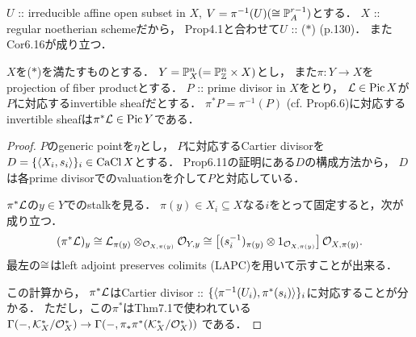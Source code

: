 \documentclass[a4paper]{jsarticle}
\newcommand{\CaCl}{\operatorname{CaCl}}
\newcommand{\Pic}{\operatorname{Pic}}
\begin{document}
    $U$ :: irreducible affine open subset in $X$, 
    $V=\pi^{-1}(U) (\cong \mathbb{P}_A^{r-1})$とする．
    $X$ :: regular noetherian schemeだから，
    Prop4.1と合わせて$U$ :: ($*$) (p.130)．
    またCor6.16が成り立つ．
    \begin{Claim}
        $X$を($*$)を満たすものとする．
        $Y=\mathbb{P}^n_X(=\mathbb{P}^n_{\mathbb{Z}} \times X)$とし，
        また$\pi: Y \to X$をprojection of fiber productとする．
        $P$ :: prime divisor in $X$をとり，
        $\shL \in \Pic X$が$P$に対応するinvertible sheafだとする．
        $\pi^* P=\pi^{-1}(P)$ (cf. Prop6.6)に対応するinvertible sheafは$\pi^* \shL \in \Pic Y$である．
    \end{Claim}
    \begin{proof}
        $P$のgeneric pointを$\eta$とし，
        $P$に対応するCartier divisorを
        $D=\{\sect{X_i}{s_i}\}_i \in \CaCl X$とする．
        Prop6.11の証明にある$D$の構成方法から，
        $D$は各prime divisorでのvaluationを介して$P$と対応している．

        $\pi^* \mathcal{L}$の$y \in Y$でのstalkを見る．
        $\pi(y) \in X_i \subseteq X$なる$i$をとって固定すると，次が成り立つ．
        \[
            (\pi^* \mathcal{L})_y
            \cong \mathcal{L}_{\pi(y)} \otimes_{\mathcal{O}_{X, \pi(y)}} \mathcal{O}_{Y, y}
            \cong \left[ (s_i^{-1})_{\pi(y)} \otimes 1_{\mathcal{O}_{X, \pi(y)}} \right]\mathcal{O}_{X, \pi(y)}.
        \]
        最左の$\cong$はleft adjoint preserves colimits (LAPC)を用いて示すことが出来る．
        
        この計算から，
        $\pi^* \mathcal{L}$はCartier divisor ::
        $\{ \langle \pi^{-1}(U_i),\pi^*(s_i) \rangle \}_i$に対応することが分かる．
        ただし，この$\pi^*$はThm7.1で使われている
        $\Gamma(-, \mathcal{K}_{X}^*/\mathcal{O}_{X}^*) \to \Gamma(-, \pi_*\pi^*(\mathcal{K}_{X}^*/\mathcal{O}_{X}^*))$
        である．


\end{proof}
\end{document}
